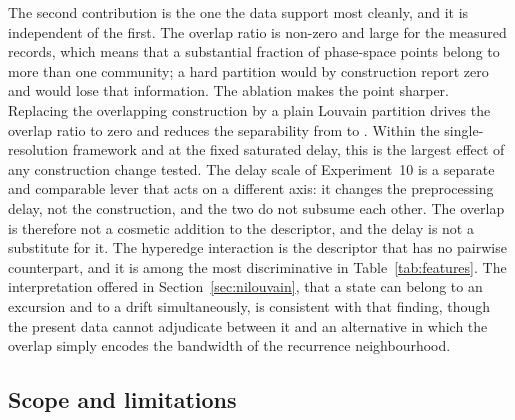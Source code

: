 \documentclass[10pt,a4paper,twocolumn]{article}
\begin{document}
The second contribution is the one the data support most cleanly, and it is
independent of the first.  The overlap ratio is non-zero and large for the
measured records, which means that a substantial fraction of phase-space
points belong to more than one community; a hard partition would by
construction report zero and would lose that information.  The ablation makes
the point sharper.  Replacing the overlapping construction by a plain Louvain
partition drives the overlap ratio to zero and reduces the separability from
\ablFull{} to \ablB{}.  Within the single-resolution framework and at the
fixed saturated delay, this is the largest effect of any construction change
tested.  The delay scale of Experiment~10 is a separate and comparable lever
that acts on a different axis: it changes the preprocessing delay, not the
construction, and the two do not subsume each other.  The overlap is therefore
not a cosmetic addition to the descriptor, and the delay is not a substitute
for it.  The hyperedge
interaction is the descriptor that has no pairwise counterpart, and it is
among the most discriminative in Table~\ref{tab:features}.  The interpretation
offered in Section~\ref{sec:nilouvain}, that a state can belong to an
excursion and to a drift simultaneously, is consistent with that finding,
though the present data cannot adjudicate between it and an alternative in
which the overlap simply encodes the bandwidth of the recurrence
neighbourhood.

\subsection{Scope and limitations}
\end{document}
